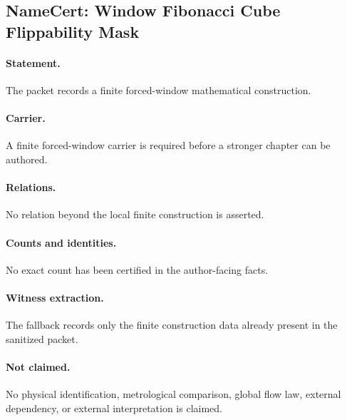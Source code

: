 \subsection{NameCert: Window Fibonacci Cube Flippability Mask}
\label{sec:namecert-window_fibonacci_cube_flippability_mask_certificate}

\paragraph{Statement.} The packet records a finite forced-window mathematical construction.

\paragraph{Carrier.} A finite forced-window carrier is required before a stronger chapter can be authored.

\paragraph{Relations.} No relation beyond the local finite construction is asserted.

\paragraph{Counts and identities.} No exact count has been certified in the author-facing facts.

\paragraph{Witness extraction.} The fallback records only the finite construction data already present in the sanitized packet.

\paragraph{Not claimed.} No physical identification, metrological comparison, global flow law, external dependency, or external interpretation is claimed.
